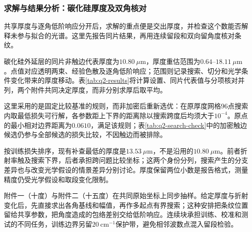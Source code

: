 \subsubsection{求解与结果分析：碳化硅厚度及双角核对}

共享厚度与逐角低阶响应分开后，求解的重点便是交出厚度，并检查这个数能否解释未参与拟合的光谱。这里先报告同片结果，再用连续留段和双向留角度核对条纹。

碳化硅外延层的同片非触边代表厚度为$10.80\ \mu\mathrm{m}$，厚度重估范围为$0.64$--$18.11\ \mu\mathrm{m}$。点值对应透明两束、经验色散及逐角低阶响应；范围则记录搜索、切分和光学条件变化带来的厚度移动。表\ref{tab:q2-results}将计算设置、同片代表值与分项核对并列，两个附件共同决定厚度，而非分别求厚后取平均。

这里采用的是固定比较基准的规则，而非加密后重新选优：在原厚度网格$96$点搜索内取最低损失可行解，各参数距上下界的距离除以搜索跨度后均须大于$10^{-4}$。原点的最小相对边界距离为$0.0610$，满足该规则；表\ref{tab:q2-search-check}中的加密触边候选仍参与全部候选的损失比较，不因触边而被排除。

按训练损失排序，现有补查最低的厚度是$13.53\ \mu\mathrm{m}$，不是沿用的$10.80\ \mu\mathrm{m}$。前者折射率触及搜索下界，后者承担跨问题比较坐标；这两个身份分列，搜索产生的分支差异也与改变光学假设的情景差异分别讨论。厚度保留两位小数是报告格式，测量精度仍受光学假设和取段变化限制。

附件一（十度）与附件二（十五度）在共同原始坐标上同步抽样。给定厚度与折射变化后，先直接求出各角基线和幅值，再作多起点有界搜索；这种安排把条纹位置留给共享参数，把角度造成的包络差别交给低阶响应。连续块承担训练、校准和测试的不同任务，训练边界另留$20\ \mathrm{cm}^{-1}$保护带，避免相邻波数点混入留段检验。

